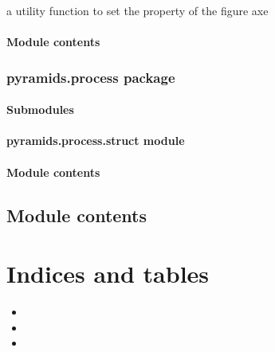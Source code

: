\documentclass[letterpaper,10pt,english]{sphinxmanual}
\begin{document}
\begin{fulllineitems}
\label{pyramids.plot:pyramids.plot.setting.setProperty}
a utility function to set the property of the figure axe

\end{fulllineitems}



\subsubsection{Module contents}
\label{pyramids.plot:module-pyramids.plot}\label{pyramids.plot:module-contents}

\subsection{pyramids.process package}
\label{pyramids.process:pyramids-process-package}\label{pyramids.process::doc}

\subsubsection{Submodules}
\label{pyramids.process:submodules}

\subsubsection{pyramids.process.struct module}
\label{pyramids.process:pyramids-process-struct-module}

\subsubsection{Module contents}
\label{pyramids.process:module-pyramids.process}\label{pyramids.process:module-contents}

\section{Module contents}
\label{pyramids:module-contents}\label{pyramids:module-pyramids}

\chapter{Indices and tables}
\label{index:indices-and-tables}\begin{itemize}
\item {} 

\item {} 

\item {} 

\end{itemize}
\end{document}
